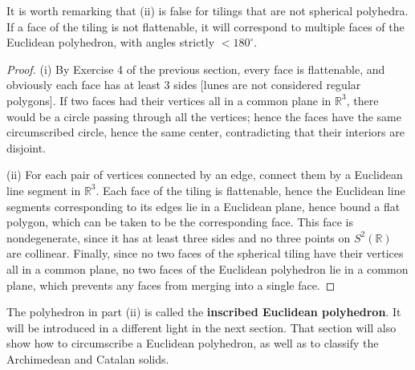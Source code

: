 \documentclass[leqno]{book}
\begin{document}
\noindent It is worth remarking that (ii) is false for tilings that are not spherical polyhedra.  If a face of the tiling is not flattenable, it will correspond to multiple faces of the Euclidean polyhedron, with angles strictly $<180^\circ$.
\begin{proof}
(i) By Exercise 4 of the previous section, every face is flattenable, and obviously each face has at least $3$ sides [lunes are not considered regular polygons].  If two faces had their vertices all in a common plane in $\mathbb R^3$, there would be a circle passing through all the vertices; hence the faces have the same circumscribed circle, hence the same center, contradicting that their interiors are disjoint.

(ii) For each pair of vertices connected by an edge, connect them by a Euclidean line segment in $\mathbb R^3$.  Each face of the tiling is flattenable, hence the Euclidean line segments corresponding to its edges lie in a Euclidean plane, hence bound a flat polygon, which can be taken to be the corresponding face.  This face is nondegenerate, since it has at least three sides and no three points on $S^2(\mathbb R)$ are collinear.  Finally, since no two faces of the spherical tiling have their vertices all in a common plane, no two faces of the Euclidean polyhedron lie in a common plane, which prevents any faces from merging into a single face.
\end{proof}

\noindent The polyhedron in part (ii) is called the \textbf{inscribed Euclidean polyhedron}.  It will be introduced in a different light in the next section.  That section will also show how to circumscribe a Euclidean polyhedron, as well as to classify the Archimedean and Catalan solids.
\end{document}
